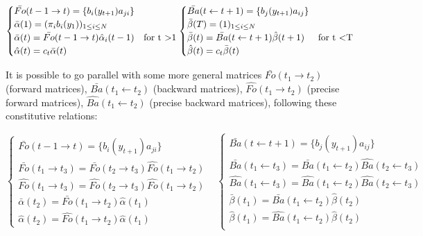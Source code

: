 \begin{equation}
\begin{cases}
\bar{Fo}( t - 1 \rightarrow t) =  \{b_i(y_{t+1})a_{ji}\} & \\
\bar{\alpha}(1) =  (\pi_i b_i(y_1))_{1 \le i \le N} & \\
\bar{\alpha}(t) =  \bar{Fo}( t - 1 \rightarrow t) \hat{\alpha}_i(t - 1) & \text{for t \textgreater 1} \\
\hat{\alpha}(t) = c_t \bar{\alpha}(t) &
\end{cases}
\begin{cases}
\bar{Ba}( t \leftarrow t + 1) = \{b_j(y_{t+1})a_{ij}\} & \\
\bar{\beta}(T) = (1)_{1 \le i \le N} & \\
\bar{\beta}(t) =  \bar{Ba}( t \leftarrow t + 1) \hat{\beta}(t + 1) & \text{for t \textless T} \\
\hat{\beta}(t) = c_t \bar{\beta}(t) &
\end{cases}
\end{equation}

It is possible to go parallel with some more general matrices $\bar{Fo}(t_1 \rightarrow t_2)$ (forward matrices), $\bar{Ba}(t_1 \leftarrow t_2)$ (backward matrices), $\hat{Fo}(t_1 \rightarrow t_2)$ (precise forward matrices), $\hat{Ba}(t_1 \leftarrow t_2)$ (precise backward matrices), following these constitutive relations:

\begin{equation}
\begin{cases}
\bar{Fo}( t - 1 \rightarrow t) =  \{b_i(y_{t+1})a_{ji}\} & \\
\bar{Fo}( t_1 \rightarrow t_3) =   \bar{Fo}( t_2 \rightarrow t_3) \hat{Fo}( t_1 \rightarrow t_2)& \\
\hat{Fo}( t_1 \rightarrow t_3) =   \hat{Fo}( t_2 \rightarrow t_3) \hat{Fo}( t_1 \rightarrow t_2)& \\
\bar{\alpha}(t_2) =  \bar{Fo}( t_1 \rightarrow t_2) \hat{\alpha}(t_1) & \\
\hat{\alpha}(t_2) =  \hat{Fo}( t_1 \rightarrow t_2) \hat{\alpha}(t_1) &
\end{cases}
\begin{cases}
\bar{Ba}( t \leftarrow t + 1) = \{b_j(y_{t+1})a_{ij}\} & \\
\bar{Ba}(t_1 \leftarrow t_3) = \bar{Ba}(t_1 \leftarrow t_2) \hat{Ba}(t_2 \leftarrow t_3) & \\
\hat{Ba}(t_1 \leftarrow t_3) = \hat{Ba}(t_1 \leftarrow t_2) \hat{Ba}(t_2 \leftarrow t_3) & \\
\bar{\beta}(t_1) =  \bar{Ba}( t_1 \leftarrow t_2) \hat{\beta}(t_2) & \\
\hat{\beta}(t_1) =  \hat{Ba}( t_1 \leftarrow t_2) \hat{\beta}(t_2) & \\
\end{cases}
\end{equation}

